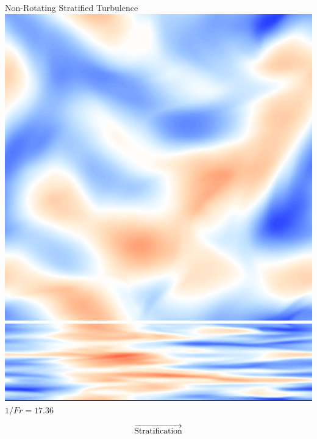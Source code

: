 \documentclass[aspecttatio=169]{beamer}
\begin{document}
\begin{frame}{Non-Rotating Stratified Turbulence}
        \includegraphics[width=.99\textwidth]{images/XYB300ux.png}
        \includegraphics[width=.99\textwidth]{images/XZB300ux.png}
        \vspace{2pt}
        $1/Fr = 17.36$

    \emp

    \[\overrightarrow{\rm Stratification}\]
\end{frame}
\end{document}

